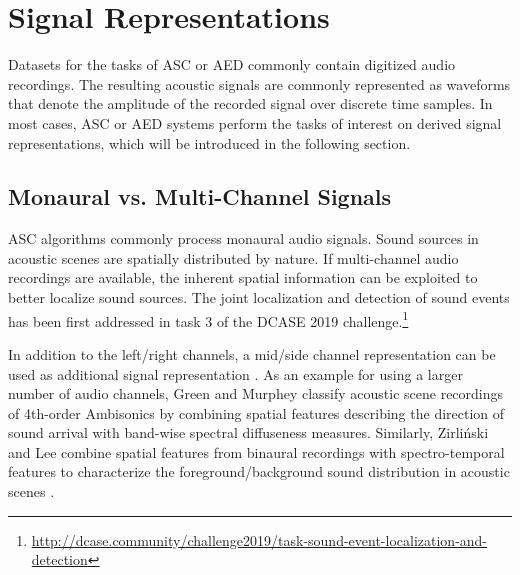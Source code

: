 \documentclass[applsci,article,submit,oneauthor,pdftex]{Definitions/mdpi}
\begin{document}
\section{Signal Representations}
\label{sec:feature_representations}
Datasets for the tasks of ASC or AED commonly contain digitized audio recordings. The resulting acoustic signals are commonly represented as waveforms that denote the amplitude of the recorded signal over discrete time samples. In most cases, ASC or AED systems perform the tasks of interest on derived signal representations, which will be introduced in the following section.


\subsection{Monaural vs. Multi-Channel Signals}

ASC algorithms commonly process monaural audio signals.
Sound sources in acoustic scenes are spatially distributed by nature.
If multi-channel audio recordings are available, the inherent spatial information can be exploited to better localize sound sources.
The joint localization and detection of sound events has been first addressed in task 3 of the DCASE 2019 challenge.\footnote{\url{http://dcase.community/challenge2019/task-sound-event-localization-and-detection}}

In addition to the left/right channels, a mid/side channel representation can be used as additional signal representation \citep{Han:2017:BinauralASC:DCASE, Mars:2019:BinauralASC:DCASE}.
As an example for using a larger number of audio channels, Green and Murphey \citep{Green:2017:SpatialFeaturesASC:DCASE} classify acoustic scene recordings of 4th-order Ambisonics by combining spatial features describing the direction of sound arrival with band-wise spectral diffuseness measures.
Similarly, Zirli{\'n}ski and Lee combine spatial features from binaural recordings with spectro-temporal features to characterize the foreground/background sound distribution in acoustic scenes \citep{Zielinski:2018:BinauralASC:FEDCSIS}.
\end{document}
